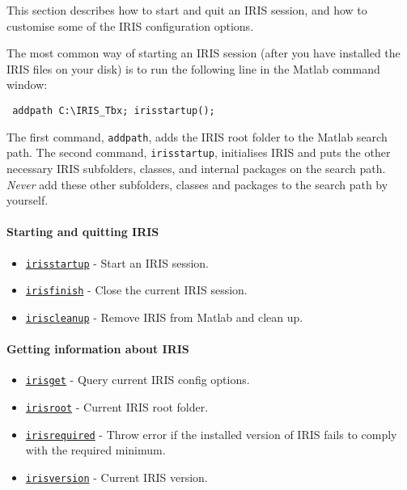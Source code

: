 

	This section describes how to start and quit an IRIS session, and how to
 customise some of the IRIS configuration options.
 
 The most common way of starting an IRIS session (after you have
 installed the IRIS files on your disk) is to run the following line in
 the Matlab command window:
 
 \begin{verbatim}
 addpath C:\IRIS_Tbx; irisstartup();
 \end{verbatim}
 
 The first command, \texttt{addpath}, adds the IRIS root folder to the
 Matlab search path. The second command, \texttt{irisstartup},
 initialises IRIS and puts the other necessary IRIS subfolders, classes,
 and internal packages on the search path. \emph{Never} add these other
 subfolders, classes and packages to the search path by yourself.
 
 \paragraph{Starting and quitting IRIS}
 
 \begin{itemize}
 \item
   \href{config/irisstartup}{\texttt{irisstartup}} - Start an IRIS
   session.
 \item
   \href{config/irisfinish}{\texttt{irisfinish}} - Close the current IRIS
   session.
 \item
   \href{config/iriscleanup}{\texttt{iriscleanup}} - Remove IRIS from
   Matlab and clean up.
 \end{itemize}
 
 \paragraph{Getting information about IRIS}
 
 \begin{itemize}
 \item
   \href{config/irisget}{\texttt{irisget}} - Query current IRIS config
   options.
 \item
   \href{config/irisroot}{\texttt{irisroot}} - Current IRIS root folder.
 \item
   \href{config/irisrequired}{\texttt{irisrequired}} - Throw error if the
   installed version of IRIS fails to comply with the required minimum.
 \item
   \href{config/irisversion}{\texttt{irisversion}} - Current IRIS
   version.
 \end{itemize}
 
